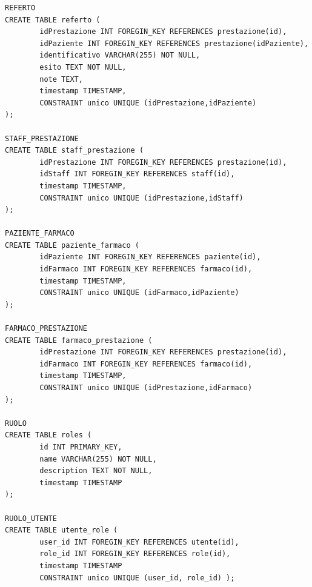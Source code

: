 \documentclass[paper=a4, fontsize=11pt,x11names]{report}
\begin{document}
\begin{verbatim}
REFERTO
CREATE TABLE referto (
        idPrestazione INT FOREGIN_KEY REFERENCES prestazione(id),
        idPaziente INT FOREGIN_KEY REFERENCES prestazione(idPaziente),
        identificativo VARCHAR(255) NOT NULL,
        esito TEXT NOT NULL,
        note TEXT,
        timestamp TIMESTAMP,
        CONSTRAINT unico UNIQUE (idPrestazione,idPaziente)
);

STAFF_PRESTAZIONE
CREATE TABLE staff_prestazione (
        idPrestazione INT FOREGIN_KEY REFERENCES prestazione(id),
        idStaff INT FOREGIN_KEY REFERENCES staff(id),
        timestamp TIMESTAMP,
        CONSTRAINT unico UNIQUE (idPrestazione,idStaff)
);

PAZIENTE_FARMACO
CREATE TABLE paziente_farmaco (
        idPaziente INT FOREGIN_KEY REFERENCES paziente(id),
        idFarmaco INT FOREGIN_KEY REFERENCES farmaco(id),
        timestamp TIMESTAMP,
        CONSTRAINT unico UNIQUE (idFarmaco,idPaziente)
);

FARMACO_PRESTAZIONE
CREATE TABLE farmaco_prestazione (
        idPrestazione INT FOREGIN_KEY REFERENCES prestazione(id),
        idFarmaco INT FOREGIN_KEY REFERENCES farmaco(id),
        timestamp TIMESTAMP,
        CONSTRAINT unico UNIQUE (idPrestazione,idFarmaco)
);

RUOLO
CREATE TABLE roles (
        id INT PRIMARY_KEY,
        name VARCHAR(255) NOT NULL,
        description TEXT NOT NULL,
        timestamp TIMESTAMP
);

RUOLO_UTENTE
CREATE TABLE utente_role (
        user_id INT FOREGIN_KEY REFERENCES utente(id),
        role_id INT FOREGIN_KEY REFERENCES role(id),
        timestamp TIMESTAMP
        CONSTRAINT unico UNIQUE (user_id, role_id) );
\end{verbatim}

\end{document}
